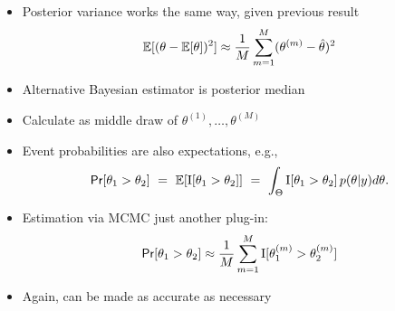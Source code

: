 \documentclass[10pt]{report}
\begin{document}
%
\begin{itemize}
\item Posterior variance works the same way, given previous result
\[
\mathbb{E}[(\theta - \mathbb{E}[\theta])^2]
\approx \frac{1}{M} \sum_{m=1}^M (\theta^{(m)} - \hat{\theta})^2
\]
\end{itemize}


%
\begin{itemize}
\item Alternative Bayesian estimator is posterior median
\item Calculate as middle draw of $\theta^{(1)}, \ldots,
  \theta^{(M)}$
\end{itemize}


%
\begin{itemize}
\item Event probabilities are also expectations, e.g.,
\[
\text{\sf Pr}[\theta_1 > \theta_2]
\ = \ \mathbb{E}[\text{I}[\theta_1 > \theta_2]]
\ = \ \int_{\Theta} \text{I}[\theta_1 > \theta_2] \, p(\theta|y) d\theta.
\]
\item Estimation via MCMC just another plug-in:
\[
\text{\sf Pr}[\theta_1 > \theta_2] \approx
\frac{1}{M} \sum_{m=1}^M \text{I}[\theta_1^{(m)} > \theta_2^{(m)}]
\]
\item Again, can be made as accurate as necessary
\end{itemize}
\end{document}

